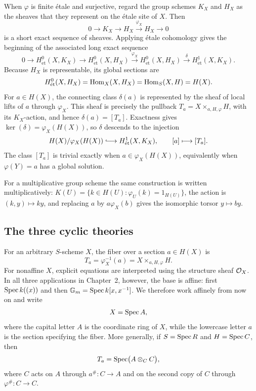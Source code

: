 When $\varphi$ is finite \'etale and surjective, regard the group schemes
$K_X$ and $H_X$ as the sheaves that they represent on the \'etale site of
$X$. Then
\[
0\longrightarrow K_X\longrightarrow H_X
\xrightarrow{\varphi_X}H_X\longrightarrow0
\]
is a short exact sequence of sheaves. Applying \'etale cohomology gives the
beginning of the associated long exact sequence
\[
0\longrightarrow H^0_{\mathrm{\acute et}}(X,K_X)
\longrightarrow H^0_{\mathrm{\acute et}}(X,H_X)
\xrightarrow{\varphi_X}H^0_{\mathrm{\acute et}}(X,H_X)
\xrightarrow{\delta}H^1_{\mathrm{\acute et}}(X,K_X).
\]
Because $H_X$ is representable, its global sections are
\[
H^0_{\mathrm{\acute et}}(X,H_X)
=\operatorname{Hom}_X(X,H_X)
=\operatorname{Hom}_S(X,H)
=H(X).
\]
For $a\in H(X)$, the connecting class $\delta(a)$ is represented by the
sheaf of local lifts of $a$ through $\varphi_X$. This sheaf is precisely the
pullback $T_a=X\times_{a,H,\varphi}H$, with its $K_X$-action, and hence
$\delta(a)=[T_a]$. Exactness gives
$\ker(\delta)=\varphi_X(H(X))$, so $\delta$ descends to the injection
\begin{equation}\label{eq:common_torsor_connecting_map}
H(X)/\varphi_X(H(X))\lhook\joinrel\longrightarrow
H^1_{\mathrm{\acute et}}(X,K_X),
\qquad [a]\longmapsto[T_a].
\end{equation}
The class $[T_a]$ is trivial exactly when $a\in\varphi_X(H(X))$, equivalently
when $\varphi(Y)=a$ has a global solution.

For a multiplicative group scheme the same construction is written
multiplicatively: $K(U)=\{k\in H(U):\varphi_U(k)=1_{H(U)}\}$, the action is
$(k,y)\mapsto ky$, and replacing $a$ by $a\varphi_X(b)$ gives the isomorphic
torsor $y\mapsto by$.

\subsection*{The three cyclic theories}

For an arbitrary $S$-scheme $X$, the fiber over a section $a\in H(X)$ is
\[
T_a=\varphi_X^{-1}(a)
   =X\times_{a,H,\varphi}H.
\]
For nonaffine $X$, explicit equations are interpreted using the structure
sheaf $\mathcal{O}_X$. In all three applications in Chapter~2, however, the base is
affine: first $\operatorname{Spec} k((x))$ and then
$\mathbb{G}_m=\operatorname{Spec} k[x,x^{-1}]$. We therefore work affinely from now on and write
\[
X=\operatorname{Spec} A,
\]
where the capital letter $A$ is the coordinate ring of $X$, while the
lowercase letter $a$ is the section specifying the fiber. More generally, if
$S=\operatorname{Spec} R$ and $H=\operatorname{Spec} C$, then
\[
T_a=\operatorname{Spec}\bigl(A\otimes_C C\bigr),
\]
where $C$ acts on $A$ through $a^\#:C\to A$ and on the second copy of $C$
through $\varphi^\#:C\to C$.

